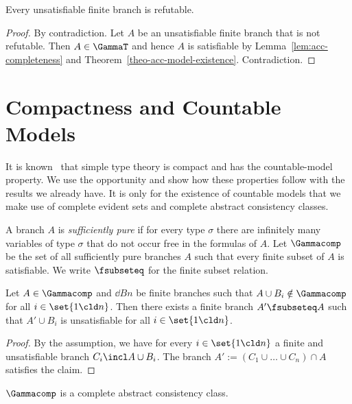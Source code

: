 \begin{thm}[Completeness]
  \label{thm:completeness}
  Every unsatisfiable finite branch is refutable.
\end{thm}

\begin{proof}
  By contradiction.  Let $A$ be an unsatisfiable finite
  branch that is not refutable.  Then $A\in\GammaT$ and
  hence $A$ is satisfiable by
  Lemma~\ref{lem:acc-completeness} and
  Theorem~\ref{theo-acc-model-existence}.  Contradiction.
\end{proof}

\section{Compactness and Countable Models}

It is known~\cite{Henkin50,AndrewsBook} that
simple type theory is compact and has the
countable-model property.  We use the opportunity and
show how these properties follow with the results we
already have.  It is only for the existence of countable
models that we make use of complete evident sets and
complete abstract consistency classes.

A branch $A$ is \emph{sufficiently pure} if for every
type $\sigma$ there are infinitely many variables of
type $\sigma$ that do not occur free in the formulas of $A$.
Let $\Gammacomp$ be the set of all sufficiently pure
branches $A$ such that every finite subset of $A$ is
satisfiable.  We write \emph{$\fsubseteq$} for the
finite subset relation.

\begin{lem}
  \label{lem-aux-compactness}
  Let $A\in\Gammacomp$ and $\dd{B}n$ be finite branches
  such that $A\cup B_i\notin\Gammacomp$ for all
  $i\in\set{1\cld n}$.  Then there exists a finite
  branch $A'\fsubseteq A$ such that $A'\cup B_i$ is
  unsatisfiable for all $i\in\set{1\cld n}$.
\end{lem}

\begin{proof}
  By the assumption, we have for every $i\in\set{1\cld
    n}$ a finite and unsatisfiable branch $C_i\incl
  A\cup B_i$.  The branch $A':=(C_1\cup\dots\cup
  C_n)\cap A$ satisfies the claim.
\end{proof}

\begin{lem}
  \label{lem:acc-compactness}
  $\Gammacomp$ is a complete abstract consistency
  class.
\end{lem}

